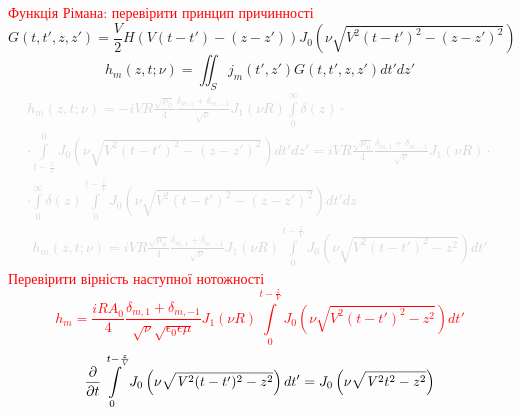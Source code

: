 %
\textcolor{red}{Функція Рімана: перевірити принцип причинності}
%
\begin{equation*}
G(t,t',z,z') = \frac{\mathit{V}}{2} H \left( \mathit{V} (t-t') - (z-z') \right)
J_0 \left( \nu \sqrt{\mathit{V}^2 (t-t')^2 - (z-z')^2} \right)
\end{equation*}
%
\begin{equation}
h_m (z, t; \nu) = \iint_S j_m (t',z') G(t,t',z,z') dt' dz'
\end{equation}
%
\textcolor{lightgray} { \begin{equation*} \begin{aligned}
h_m (z, t; \nu) = - i \mathit{V} R \frac{\sqrt{\mu_0}}{4} 
\frac{\delta_{m,1} + \delta_{m,-1}}{\sqrt{\nu}} J_1 (\nu R)
\int \limits_{0}^{\infty} \delta(z) \cdot \\ \cdot
\int \limits_{t - \frac{z}{\mathit{V}}}^{0} 
J_0 \left( \nu \sqrt{\mathit{V}^2 (t-t')^2 - (z-z')^2} \right) dt' dz' = 
i \mathit{V} R \frac{\sqrt{\mu_0}}{4} 
\frac{\delta_{m,1} + \delta_{m,-1}}{\sqrt{\nu}} J_1 (\nu R)
\cdot \\ \cdot \int \limits_{0}^{\infty} \delta(z)
\int \limits_{0}^{t - \frac{z}{\mathit{V}}} 
J_0 \left( \nu \sqrt{\mathit{V}^2 (t-t')^2 - (z-z')^2} \right) dt' dz
\end{aligned} \end{equation*} }
%
\textcolor{lightgray} { \begin{equation*} \begin{aligned}
h_m (z, t; \nu) = i \mathit{V} R \frac{\sqrt{\mu_0}}{4} 
\frac{\delta_{m,1} + \delta_{m,-1}}{\sqrt{\nu}} J_1 (\nu R)
\int \limits_{0}^{t - \frac{z}{\mathit{V}}} 
J_0 \left( \nu \sqrt{\mathit{V}^2 (t-t')^2 - z^2} \right) dt'
\end{aligned} \end{equation*} }
%
\textcolor{red}{Перевірити вірність наступної нотожності
%
\begin{equation}
h_m = \frac{i R A_0}{4} \frac{\delta_{m,1} + \delta_{m,-1}}
{\sqrt{\nu} \sqrt{\epsilon_0 \epsilon \mu}} J_1 (\nu R) 
\int \limits_{0}^{t - \frac{z}{\mathit{V}}} 
J_0 \left( \nu \sqrt{\mathit{V}^2 (t-t')^2 - z^2} \right) dt'
\end{equation} }
%
\textcolor{red} { \begin{equation*} \begin{aligned}
\frac{\partial }{\partial t} \int \limits_{0}^{t - \frac{z}{\mathit{V}}} 
J_0 \left( \nu \sqrt{\mathit{V}^2 (t-t')^2 - z^2} \right) dt' =
J_0 \left( \nu \sqrt{\mathit{V}^2 t^2 - z^2} \right)
\end{aligned} \end{equation*} }
